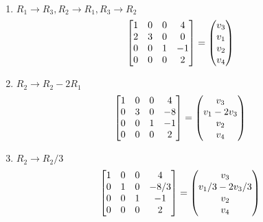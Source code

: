 \documentclass{article}
\begin{document}
\begin{enumerate}[(Step 1): ]
    \item $R_1 \to R_3, R_2 \to R_1, R_3 \to R_2$
          \[ \begin{bmatrix}
                  1 & 0 & 0 & 4  \\
                  2 & 3 & 0 & 0  \\
                  0 & 0 & 1 & -1 \\
                  0 & 0 & 0 & 2
              \end{bmatrix} = \begin{pmatrix}
                  v_3 \\
                  v_1 \\
                  v_2 \\
                  v_4
              \end{pmatrix}\\ \]
    \item $R_2 \to R_2 - 2R_1$
          \[ \begin{bmatrix}
                  1 & 0 & 0 & 4  \\
                  0 & 3 & 0 & -8 \\
                  0 & 0 & 1 & -1 \\
                  0 & 0 & 0 & 2
              \end{bmatrix} = \begin{pmatrix}
                  v_3        \\
                  v_1 - 2v_3 \\
                  v_2        \\
                  v_4
              \end{pmatrix}\\ \]
    \item $R_2 \to R_2/3$
          \[ \begin{bmatrix}
                  1 & 0 & 0 & 4    \\
                  0 & 1 & 0 & -8/3 \\
                  0 & 0 & 1 & -1   \\
                  0 & 0 & 0 & 2
              \end{bmatrix} = \begin{pmatrix}
                  v_3            \\
                  v_1/3 - 2v_3/3 \\
                  v_2            \\
                  v_4
              \end{pmatrix}\\ \]

\end{enumerate}
\end{document}
